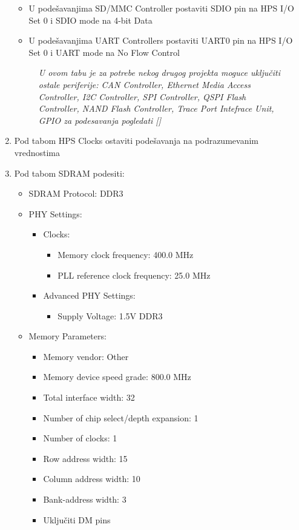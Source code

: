\begin{enumerate}
\begin{itemize}
\item	U podešavanjima SD/MMC Controller postaviti SDIO pin na HPS I/O Set 0 i SDIO mode na 4-bit Data
\item	U podešavanjima UART Controllers postaviti UART0 pin na HPS I/O Set 0 i UART mode na No Flow Control
\end{itemize}
	\begin{figure}[h!]
	\centering
	\textit{U ovom tabu je za potrebe nekog drugog projekta moguce uključiti ostale periferije: CAN Controller, Ethernet Media Access Controller, I2C Controller, SPI Controller, QSPI Flash Controller, NAND Flash Controller, Trace Port Intefrace Unit, GPIO za podesavanja pogledati []}
	\end{figure}
\item  Pod tabom HPS Clocks ostaviti podešavanja na podrazumevanim vrednostima
\item  Pod tabom SDRAM podesiti:
\begin{itemize}
\item	SDRAM Protocol: DDR3
\item	PHY Settings:
\begin{itemize}
\item		Clocks:
\begin{itemize}
\item			Memory clock frequency: 400.0 MHz
\item			PLL reference clock frequency: 25.0 MHz
\end{itemize}
\item		Advanced PHY Settings:
\begin{itemize}
\item			Supply Voltage: 1.5V DDR3
\end{itemize}
\end{itemize}
\item	Memory Parameters:
\begin{itemize}
\item		Memory vendor: Other
\item		Memory device speed grade: 800.0 MHz
\item		Total interface width: 32
\item		Number of chip select/depth expansion: 1
\item		Number of clocks: 1
\item		Row address width: 15
\item		Column address width: 10
\item		Bank-address width: 3
\item		Uključiti DM pins

\end{itemize}
\end{itemize}
\end{enumerate}

